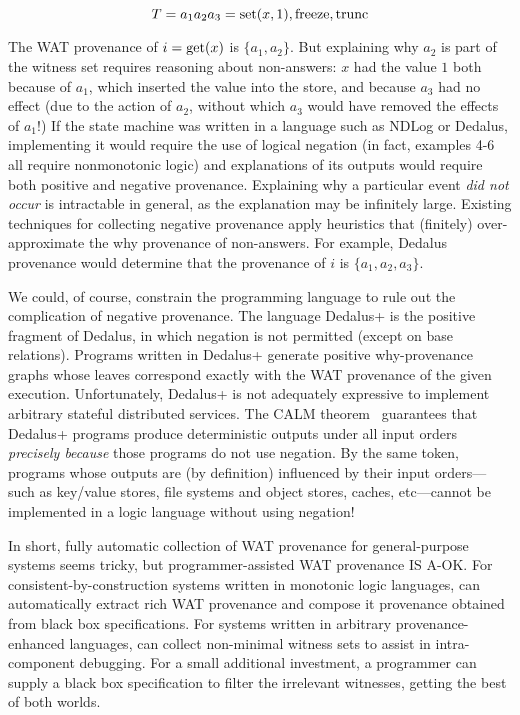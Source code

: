 \[
  T = a_1 a_2 a_3 = \text{set}(x,1), \text{freeze}, \text{trunc}
\]

The WAT provenance of $i = \text{get}(x)$ is $\{a_1, a_2\}$.  But explaining why $a_2$ is part of the witness set requires reasoning about non-answers: $x$ had the value $1$ both because of $a_1$, 
which inserted the value into the store, and because $a_3$ had no effect (due to the action of $a_2$, without which $a_3$ would have removed the effects of $a_1$!)  
If the state machine was written in a language such as NDLog or Dedalus, implementing it would require the use of logical negation (in fact, examples 4-6 all require nonmonotonic logic) and explanations of its outputs would require both positive and negative provenance.  Explaining why a particular event \emph{did not occur} is intractable in general, as the explanation may be infinitely large.  Existing techniques for collecting negative provenance apply heuristics that (finitely) over-approximate the why provenance of non-answers.  For example, Dedalus provenance would determine that the provenance of $i$ is $\{a_1, a_2, a_3\}$.

We could, of course, constrain the programming language to rule out the complication of negative provenance.  The language Dedalus+\cite{marczak2012confluence} is the positive fragment of Dedalus, in which negation is not permitted (except on base relations).    Programs written in Dedalus+ generate positive why-provenance graphs whose leaves correspond exactly with the WAT provenance of the given execution. Unfortunately, Dedalus+ is not adequately expressive to implement arbitrary stateful distributed services.  The CALM theorem~\cite{alvaro2011consistency,ameloot2013transducers} guarantees that Dedalus+ programs produce deterministic outputs under all input orders \emph{precisely because} those programs do not use negation.  By the same token, programs whose outputs are (by definition) influenced by their input orders---such as key/value stores, file systems and object stores, caches, etc---cannot be implemented in a logic language without using negation!

In short, fully automatic collection of WAT provenance for general-purpose systems seems tricky, but programmer-assisted WAT provenance IS A-OK.  For consistent-by-construction systems written in monotonic logic languages, \fluent{} can automatically extract rich WAT provenance and compose it provenance obtained from black box specifications.  For systems written in arbitrary provenance-enhanced languages, \fluent{} can collect non-minimal witness sets to assist in intra-component debugging.  For a small additional investment, a programmer can supply a black box specification to filter the irrelevant witnesses, getting the best of both worlds.

